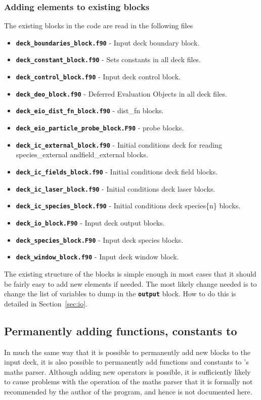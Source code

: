 \documentclass[12pt,a4paper]{article}
\newcommand{\inlinecode}[1]{{\color{warwickred} \bf\texttt{#1}}}
\newcommand{\EPOCH}{{\color{warwickdark}\fontfamily{phv}\selectfont{EPOCH}}}
\begin{document}
\subsubsection{Adding elements to existing blocks}
The existing blocks in the code are read in the following files
\begin{itemize}
\item \inlinecode{deck\_boundaries\_block.f90} - Input deck boundary block.
\item \inlinecode{deck\_constant\_block.f90} - Sets constants in all deck files.
\item \inlinecode{deck\_control\_block.f90} - Input deck control block.
\item \inlinecode{deck\_deo\_block.f90} - Deferred Evaluation Objects in all
  deck files.
\item \inlinecode{deck\_eio\_dist\_fn\_block.f90} - dist\_fn blocks.
\item \inlinecode{deck\_eio\_particle\_probe\_block.F90} - probe blocks.
\item \inlinecode{deck\_ic\_external\_block.f90} - Initial conditions deck for
  reading species\_external and\linebreak field\_external blocks.
\item \inlinecode{deck\_ic\_fields\_block.f90} - Initial conditions deck field
  blocks.
\item \inlinecode{deck\_ic\_laser\_block.f90} - Initial conditions deck laser
  blocks.
\item \inlinecode{deck\_ic\_species\_block.f90} - Initial conditions deck
  species\{n\} blocks.
\item \inlinecode{deck\_io\_block.F90} - Input deck output blocks.
\item \inlinecode{deck\_species\_block.F90} - Input deck species blocks.
\item \inlinecode{deck\_window\_block.f90} - Input deck window block.
\end{itemize}

The existing structure of the blocks is simple enough in most cases that it
should be fairly easy to add new elements if needed. The most likely change
needed is to change the list of variables to dump in the \inlinecode{output}
block. How to do this is detailed in Section~\ref{sec:io}.

\subsection{Permanently adding functions, constants to {\EPOCH}}
\label{sec:maths}
In much the same way that it is possible to permanently add new blocks to the
input deck, it is also possible to permanently add functions and constants to
{\EPOCH}'s maths parser. Although adding new operators is possible, it is
sufficiently likely to cause problems with the operation of the maths parser
that it is formally not recommended by the author of the program, and hence is
not documented here.
\end{document}
